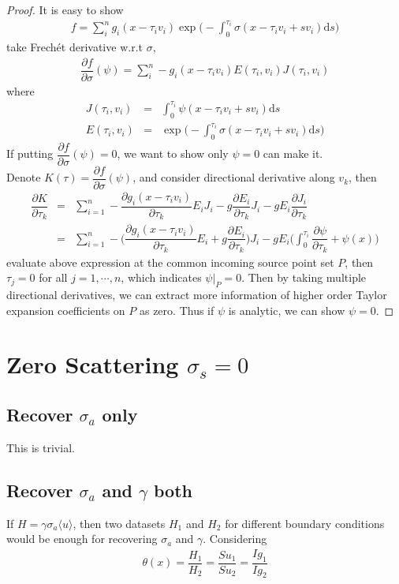 \documentclass[12pt,a4paper]{article}
\newcommand{\avg}[1]{\langle#1\rangle}
\begin{document}
\begin{proof}
It is easy to show 
\begin{eqnarray}
f = \sum_i^n g_i(x - \tau_i v_i) \exp\Big(-\int_0^{\tau_i} \sigma(x-\tau_i v_i + sv_i)\mathrm{d}s\Big)
\end{eqnarray}
take Frech\'{e}t derivative w.r.t $\sigma$,
\begin{eqnarray}
\dfrac{\partial f}{\partial \sigma}(\psi) =\sum_i^n -g_i(x - \tau_i v_i)E(\tau_i,v_i)J(\tau_i,v_i)
\end{eqnarray}
where
\begin{eqnarray}
J(\tau_i,v_i) &=& \int_0^{\tau_i} \psi(x-\tau_i v_i + sv_i)\mathrm{d}s \\ 
E(\tau_i,v_i) &=&  \exp\Big(-\int_0^{\tau_i} \sigma(x-\tau_i v_i + sv_i)\mathrm{d}s\Big)
\end{eqnarray}
If putting $\dfrac{\partial f}{\partial \sigma}(\psi) = 0$, we want to show only $\psi =0$ can make it.
\\
Denote $K(\tau) = \dfrac{\partial f}{\partial \sigma}(\psi)$, and consider directional derivative along $v_k$, then
\begin{eqnarray}
\dfrac{\partial K}{\partial \tau_k} &=& \sum_{i=1}^n -\dfrac{\partial g_i(x-\tau_i v_i)}{\partial \tau_k}E_i J_i -g\dfrac{\partial E_i}{\partial \tau_k} J_i - gE_i\dfrac{\partial J_i}{\partial\tau_k}\\
&=& \sum_{i=1}^n -\Big(\dfrac{\partial g_i(x-\tau_i v_i)}{\partial \tau_k}E_i + g\dfrac{\partial E_i}{\partial \tau_k}  \Big) J_i - gE_i\Big(\int_0^{\tau_i}\dfrac{\partial \psi}{\partial \tau_k} + \psi(x)\Big)
\end{eqnarray}
evaluate above expression at the common incoming source point set $P$, then $\tau_j = 0$ for all $j=1,\cdots,n$, which indicates $\psi|_P = 0$.
Then by taking multiple directional derivatives, we can extract more information of higher order Taylor expansion coefficients on $P$ as zero. Thus if $\psi$ is analytic, we can show $\psi = 0$.
\end{proof}
\section{Zero Scattering $\sigma_s = 0$}
\subsection{Recover $\sigma_a$ only}
This is trivial.
\subsection{Recover $\sigma_a$ and $\gamma$ both}
If $H = \gamma\sigma_a \avg{u}$, then two datasets $H_1$ and $H_2$ for different boundary conditions would be enough for recovering $\sigma_a$ and $\gamma$. Considering 
\begin{eqnarray}\label{eq:31}
\theta(x) = \dfrac{H_1}{H_2} = \dfrac{Su_1}{Su_2} =\dfrac{Ig_1}{Ig_2}
\end{eqnarray}
\end{document}
